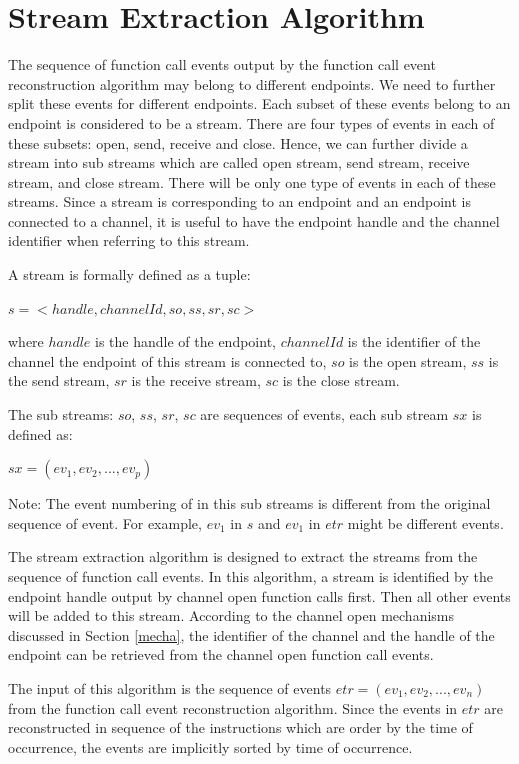 \section{Stream Extraction Algorithm}
The sequence of function call events output by the function call event reconstruction algorithm may belong to different endpoints. We need to further split these events for different endpoints.  Each subset of these events belong to an endpoint is considered to be a stream. There are four types of events in each of these subsets: open, send, receive and close. Hence, we can further divide a stream into sub streams which are called open stream, send stream, receive stream, and close stream. There will be only one type of events in each of these streams. Since a stream is corresponding to an endpoint and an endpoint is connected to a channel, it is useful to have the endpoint handle and the channel identifier when referring to this stream. 

A  stream is formally defined as a tuple:

$s = <handle, channelId, so, ss, sr, sc>$

where $handle$ is the handle of the endpoint, $channelId$ is the identifier of the channel the endpoint of this stream is connected to, $so$ is the open stream, $ss$ is the send stream, $sr$ is the receive stream, $sc$ is the close stream. 

The sub streams: $so$, $ss$, $sr$, $sc$ are sequences of events, each sub stream $sx$ is defined as:

$sx = (ev_1, ev_2, ..., ev_p)$

Note: The event numbering of in this sub streams is different from the original sequence of event. For example, $ev_1$ in $s$ and $ev_1$ in $etr$ might be different events.

The stream extraction algorithm is designed to extract the streams from the sequence of function call events. In this algorithm, a stream is identified by the endpoint handle output by channel open function calls first. Then all other events will be added to this stream.  According to the channel open mechanisms discussed in Section \ref{mecha}, the identifier of the channel and the handle of the endpoint can be retrieved from the channel open function call events.

The input of this algorithm is the sequence of events $etr = (ev_1, ev_2, ..., ev_n)$ from the function call event reconstruction algorithm. Since the events in $etr$ are reconstructed in sequence of the instructions which are order by the time of occurrence, the events are implicitly sorted by time of occurrence. 

